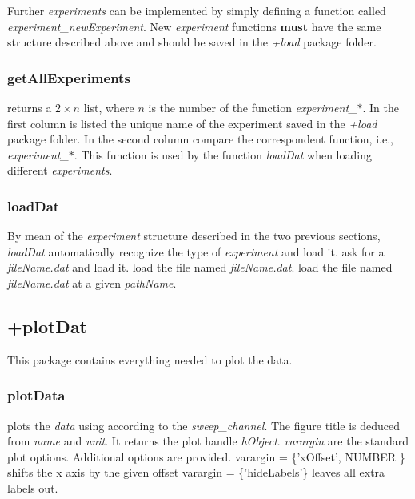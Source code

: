Further \emph{experiments} can be implemented by simply defining a function called \emph{experiment\_newExperiment}. New \emph{experiment} functions \textbf{must} have the same structure described above and should be saved in the \emph{+load} package folder.

\subsubsection{getAllExperiments}
\bdf
{} returns a $2 \times n$ list, where $n$ is the number of the function \emph{experiment\_$\ast$}.
In the first column is listed the unique name of the experiment saved in the \emph{+load} package folder.
In the second column compare the correspondent function, i.e., \emph{experiment\_$\ast$}.
\edf
This function is used by the function \emph{loadDat} when loading different \emph{experiments}.


\subsubsection{loadDat}
By mean of the \emph{experiment} structure described in the two previous sections, \emph{loadDat} automatically recognize the type of \emph{experiment} and load it.
\bdf
{} ask for a \emph{fileName.dat} and load it.
 load the file named \emph{fileName.dat}.
 load the file named \emph{fileName.dat} at a given \emph{pathName}.
\edf

\subsection{+plotDat}
This package contains everything needed to plot the data.
\subsubsection{plotData}
\bdf
{} plots the \emph{data} using according to the \emph{sweep\_channel}. The figure title is deduced from \emph{name} and \emph{unit}. It returns the plot handle \emph{hObject}. \emph{varargin} are the standard plot options. Additional options are provided.
\bi
\+ varargin = \{'xOffset', NUMBER \} shifts the x axis by the given offset
\+ varargin = \{'hideLabels'\} leaves all extra labels out.
\ei
\edf

